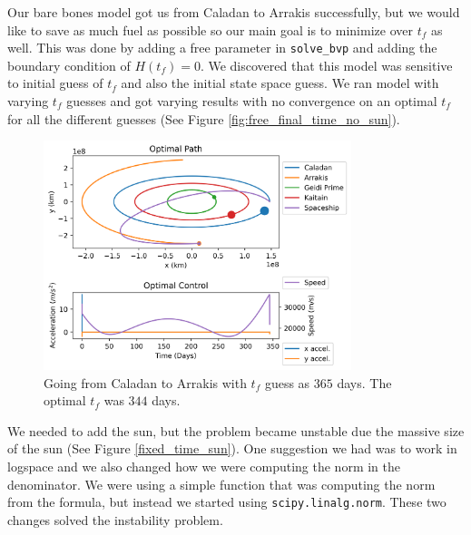 \documentclass[11pt]{amsart}
\begin{document}
Our bare bones model got us from Caladan to Arrakis successfully, but we would like to save as much fuel as possible so our main goal is to minimize over $t_f$ as well. This was done by 
adding a free parameter in \lstinline{solve_bvp} and adding the boundary condition of $H(t_f) = 0$. We discovered that this model was sensitive to initial guess of $t_f$ and also the initial
state space guess. We ran model with varying $t_f$ guesses and got varying results with no convergence on an optimal $t_f$ for all the different guesses (See Figure \ref{fig:free_final_time_no_sun}). 

\begin{figure}[htp]
    \centering
    \includegraphics[width=0.8\textwidth]{f5.png}\hfill
    \caption{Going from Caladan to Arrakis with $t_f$ guess as $365$ days. The optimal $t_f$ was $344$ days.}
    \label{fig:free_time_no_sun}
\end{figure}

We needed to add the sun, but the problem became unstable due the massive size of the sun (See Figure \ref{fixed_time_sun}). One suggestion we had was to work in logspace and we also changed how 
we were computing the norm in the denominator. We were using a simple function that was computing the norm from the formula, but instead we started using \lstinline{scipy.linalg.norm}. These two changes 
solved the instability problem.
\end{document}
